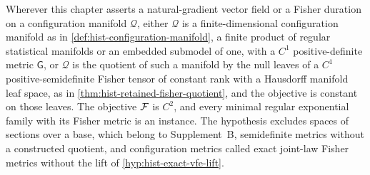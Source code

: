 \label{hyp:hist-regular-metric-domain}%
Wherever this chapter asserts a natural-gradient vector field or a Fisher duration on a
configuration manifold $\mathcal Q$, either $\mathcal Q$ is a finite-dimensional
configuration manifold as in \cref{def:hist-configuration-manifold}, a finite product of
regular statistical manifolds or an embedded submodel of one, with a $C^1$
positive-definite metric $\mathsf G$, or $\mathcal Q$ is the quotient of such a manifold
by the null leaves of a $C^1$ positive-semidefinite Fisher tensor of constant rank with a
Hausdorff manifold leaf space, as in \cref{thm:hist-retained-fisher-quotient}, and the
objective is constant on those leaves.  The objective $\mathcal F$ is $C^2$, and every
minimal regular exponential family with its Fisher metric is an instance.  The hypothesis
excludes spaces of sections over a base, which belong to Supplement~B, semidefinite
metrics without a constructed quotient, and configuration metrics called exact joint-law
Fisher metrics without the lift of \cref{hyp:hist-exact-vfe-lift}.

